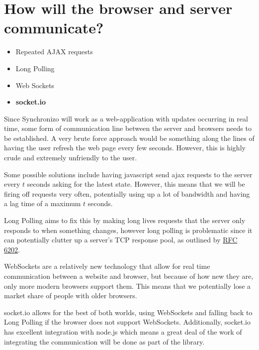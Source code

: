 \documentclass[12pt]{report}
\begin{document}
\section{How will the browser and server communicate?}
\begin{itemize}
    \item{Repeated AJAX requests}
    \item{Long Polling}
    \item{Web Sockets}
    \item\textbf{socket.io}
\end{itemize}
Since Synchronizo will work as a web-application with updates occurring in real time, some form of communication line between the server and browsers needs to be established. A very brute force approach would be something along the lines of having the user refresh the web page every few seconds. However, this is highly crude and extremely unfriendly to the user.

Some possible solutions include having javascript send ajax requests to the server every $t$ seconds asking for the latest state. However, this means that we will be firing off requests very often, potentially using up a lot of bandwidth and having a lag time of a maximum $t$ seconds.

Long Polling aims to fix this by making long lives requests that the server only responds to when something changes, however long polling is problematic since it can potentially clutter up a server's TCP response pool, as outlined by \href{https://tools.ietf.org/html/rfc6202}{\color{blue} RFC 6202}.

WebSockets are a relatively new technology that allow for real time communication between a website and browser, but because of how new they are, only more modern browsers support them. This means that we potentially lose a market share of people with older browsers.

socket.io allows for the best of both worlds, using WebSockets and falling back to Long Polling if the browser does not support WebSockets. Additionally, socket.io has excellent integration with node.js which means a great deal of the work of integrating the communication will be done as part of the library.
\end{document}
